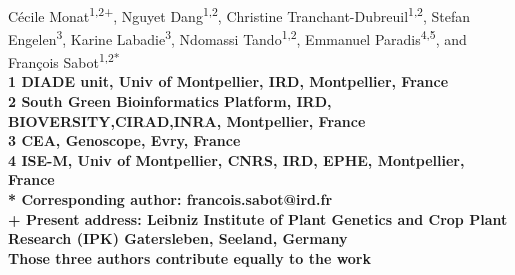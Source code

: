 \documentclass[10pt,letterpaper]{article}
\begin{document}
\vspace*{0.35in}

\begin{flushleft}
{\Large
\textbf{}
}
\newline
\\
Cécile Monat\textsuperscript{1,2{+}\textdagger},
Nguyet Dang\textsuperscript{1,2\textdagger},
Christine Tranchant-Dubreuil\textsuperscript{1,2\textdagger},
Stefan Engelen\textsuperscript{3},
Karine Labadie\textsuperscript{3},
Ndomassi Tando\textsuperscript{1,2},
Emmanuel Paradis\textsuperscript{4,5},
and François Sabot\textsuperscript{1,2*}
\\
\bigskip
\bf{1} DIADE unit, Univ of Montpellier, IRD, Montpellier, France
\\
\bf{2} South Green Bioinformatics Platform, IRD, BIOVERSITY,CIRAD,INRA, Montpellier, France
\\
\bf{3} CEA, Genoscope, Evry, France
\\
\bf{4} ISE-M, Univ of Montpellier, CNRS, IRD, EPHE, Montpellier, France
\\
\bigskip
* Corresponding author: francois.sabot@ird.fr\\
{+} Present address: Leibniz Institute of Plant Genetics and Crop Plant Research (IPK) Gatersleben, Seeland, Germany\\
\textdagger Those three authors contribute equally to the work\\
\end{flushleft}
\end{document}
